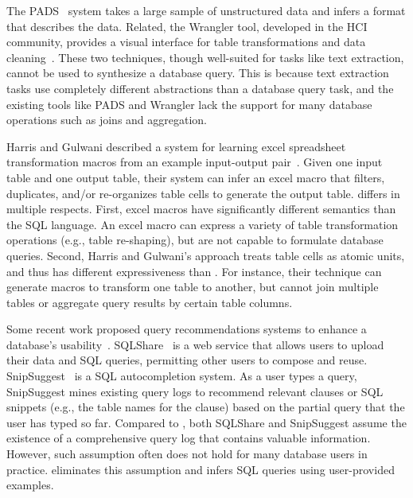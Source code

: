 The PADS~\cite{Fisher:2008} system takes a large sample
of unstructured data and infers a
format that describes the data. Related,
the Wrangler tool, developed in the HCI community,
provides a visual interface for table transformations
and data cleaning~\cite{Kandel:2011}.
These two techniques, though well-suited for tasks
like text extraction, cannot be used to 
synthesize a database query.
This is because text extraction tasks
use completely different abstractions than a database query task,
and the existing tools like PADS and Wrangler lack the support for many database operations
such as joins and aggregation.




Harris and Gulwani described a system for learning excel
spreadsheet transformation macros from an example
input-output pair~\cite{Harris:2011}. Given one input table and one output
table, their system can infer an excel macro that filters,
duplicates, and/or re-organizes table cells to generate the output table.
\ourtool differs in multiple respects.
First, excel macros have significantly different
semantics than the SQL language.
An excel macro can express a variety of table transformation operations
(e.g., table re-shaping), but are not capable to formulate database queries.
Second, Harris and Gulwani's approach treats table cells
as atomic units, and thus has different expressiveness
than \ourtool. For instance, their technique can generate macros to
transform one table to another, but cannot join multiple
tables or aggregate query results by certain table columns. 




Some recent work proposed query recommendations systems
to enhance a database's usability~\cite{Howe:2011, Khoussainova:2010}. 
SQLShare~\cite{Howe:2011} is a web service that allows
users to upload their data and SQL queries,
permitting other users
to compose and reuse. SnipSuggest~\cite{Khoussainova:2010} is a SQL autocompletion
system. As a user types a query, SnipSuggest mines existing query
logs to recommend relevant clauses or SQL snippets (e.g., the table
names for the  clause) based on the partial query that
the user has typed so far.
Compared to \ourtool, both SQLShare and SnipSuggest assume the
existence of a comprehensive query log
that contains valuable information.
However, such assumption often does not hold for
many database users in practice.
\ourtool eliminates this assumption and infers 
SQL queries using user-provided examples.


